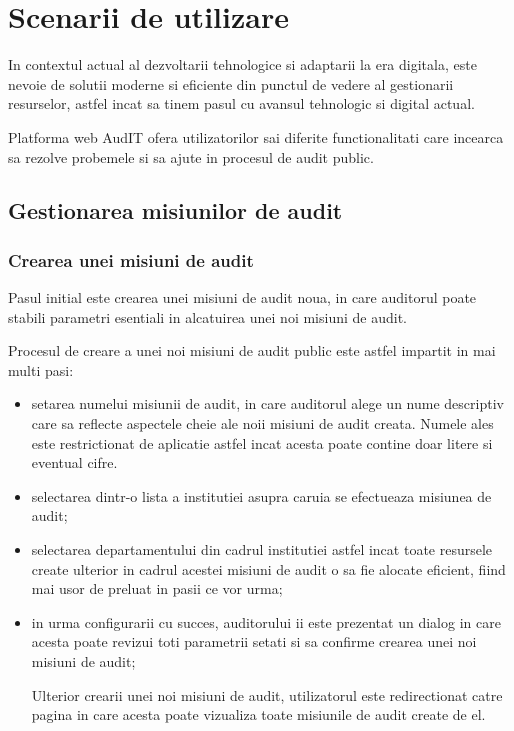 \chapter{Scenarii de utilizare }

In contextul actual al dezvoltarii tehnologice si adaptarii la era digitala, este nevoie de solutii moderne si eficiente din punctul de vedere al gestionarii resurselor, astfel incat sa tinem pasul cu avansul tehnologic si digital actual.

Platforma web AudIT ofera utilizatorilor sai diferite functionalitati care incearca sa rezolve probemele si sa ajute in procesul de audit public.

\section{Gestionarea misiunilor de audit}
\subsection*{Crearea unei misiuni de audit}
Pasul initial este crearea unei misiuni de audit noua, in care auditorul poate stabili parametri esentiali in alcatuirea unei noi misiuni de audit.

Procesul de creare a unei noi misiuni de audit public este astfel impartit in mai multi pasi:

\begin{itemize}
	\item   setarea numelui misiunii de audit, in care auditorul alege un nume descriptiv care sa reflecte aspectele cheie ale noii misiuni de audit creata. Numele ales este restrictionat de aplicatie astfel incat acesta poate contine doar litere si eventual cifre.
	
	\item  selectarea dintr-o lista a institutiei asupra caruia se efectueaza misiunea de audit;
	
	\item selectarea departamentului din cadrul institutiei astfel incat toate resursele create ulterior in cadrul acestei misiuni de audit o sa fie alocate eficient, fiind mai usor de preluat in pasii ce vor urma;
	
	\item in urma configurarii cu succes, auditorului ii este prezentat un dialog in care acesta poate revizui toti parametrii setati si sa confirme crearea unei noi misiuni de audit;
	
	Ulterior crearii unei noi misiuni de audit, utilizatorul este redirectionat catre pagina in care acesta poate vizualiza toate misiunile de audit create de el.
\end{itemize}

